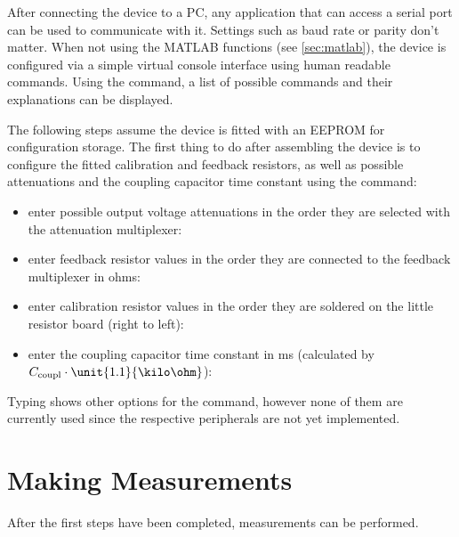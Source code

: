 After connecting the device to a PC, any application that can access a serial port can be used to communicate with it.
Settings such as baud rate or parity don't matter.
When not using the MATLAB functions (see \autoref{sec:matlab}), the device is configured via a simple virtual console
interface using human readable commands. Using the  command, a list of possible commands and their
explanations can be displayed.

The following steps assume the device is fitted with an EEPROM for configuration storage.
The first thing to do after assembling the device is to configure the fitted calibration and feedback resistors, as well
as possible attenuations and the coupling capacitor time constant using the  command:
\begin{itemize}
	\item enter possible output voltage attenuations in the order they are selected with the attenuation multiplexer:
  \item enter feedback resistor values in the order they are connected to the feedback multiplexer in ohms:
  \item enter calibration resistor values in the order they are soldered on the little resistor board (right to left):
  \item enter the coupling capacitor time constant in ms (calculated by $ C_\text{coupl} \cdot \unit{1.1}{\kilo\ohm} $):
\end{itemize}
Typing  shows other options for the  command, however none of them are currently
used since the respective peripherals are not yet implemented.


\section{Making Measurements}

After the first steps have been completed, measurements can be performed.

